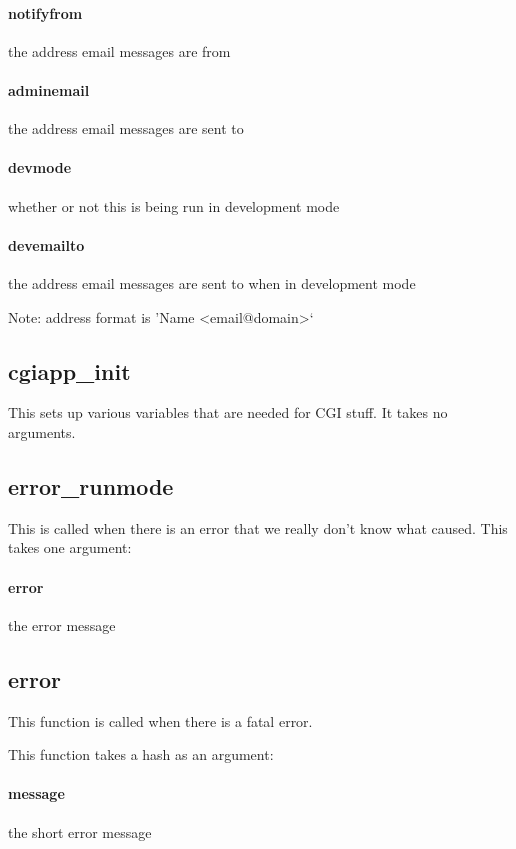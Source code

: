 \documentclass[12pt,titlepage]{article}
\begin{document}
\paragraph{notifyfrom}
the address email messages are from 

\paragraph{adminemail}
the address email messages are sent to 

\paragraph{devmode}
whether or not this is being run in development mode 

\paragraph{devemailto}
the address email messages are sent to when in development mode 

Note: address format is 'Name <email@domain>`

\subsection{cgiapp_init}
This sets up various variables that are needed for CGI stuff. It takes no arguments.

\subsection{error_runmode}
This is called when there is an error that we really don't know what caused. This takes one argument:

\paragraph{error}
the error message

\subsection{error}
This function is called when there is a fatal error.

This function takes a hash as an argument:
\paragraph{message}
the short error message 
\end{document}
